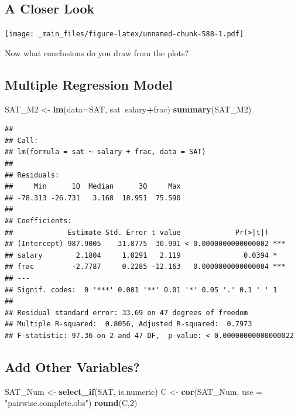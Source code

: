 \documentclass[]{book}
\newenvironment{Shaded}{\begin{snugshade}}{\end{snugshade}}
\newcommand{\KeywordTok}[1]{\textcolor[rgb]{0.13,0.29,0.53}{\textbf{#1}}}
\newcommand{\DataTypeTok}[1]{\textcolor[rgb]{0.13,0.29,0.53}{#1}}
\newcommand{\DecValTok}[1]{\textcolor[rgb]{0.00,0.00,0.81}{#1}}
\newcommand{\StringTok}[1]{\textcolor[rgb]{0.31,0.60,0.02}{#1}}
\newcommand{\OperatorTok}[1]{\textcolor[rgb]{0.81,0.36,0.00}{\textbf{#1}}}
\newcommand{\NormalTok}[1]{#1}
\begin{document}
\subsection{A Closer Look}\label{a-closer-look-1}

\texttt{[image: \_main\_files/figure-latex/unnamed-chunk-588-1.pdf]}

Now what conclusions do you draw from the plots?

\subsection{Multiple Regression
Model}\label{multiple-regression-model-2}

\begin{Shaded}
\begin{Highlighting}[]
\NormalTok{SAT_M2 <-}\StringTok{ }\KeywordTok{lm}\NormalTok{(}\DataTypeTok{data=}\NormalTok{SAT, sat}\OperatorTok{~}\NormalTok{salary}\OperatorTok{+}\NormalTok{frac)}
\KeywordTok{summary}\NormalTok{(SAT_M2)}
\end{Highlighting}
\end{Shaded}

\begin{verbatim}
## 
## Call:
## lm(formula = sat ~ salary + frac, data = SAT)
## 
## Residuals:
##     Min      1Q  Median      3Q     Max 
## -78.313 -26.731   3.168  18.951  75.590 
## 
## Coefficients:
##             Estimate Std. Error t value             Pr(>|t|)    
## (Intercept) 987.9005    31.8775  30.991 < 0.0000000000000002 ***
## salary        2.1804     1.0291   2.119               0.0394 *  
## frac         -2.7787     0.2285 -12.163   0.0000000000000004 ***
## ---
## Signif. codes:  0 '***' 0.001 '**' 0.01 '*' 0.05 '.' 0.1 ' ' 1
## 
## Residual standard error: 33.69 on 47 degrees of freedom
## Multiple R-squared:  0.8056, Adjusted R-squared:  0.7973 
## F-statistic: 97.36 on 2 and 47 DF,  p-value: < 0.00000000000000022
\end{verbatim}

\subsection{Add Other Variables?}\label{add-other-variables}

\begin{Shaded}
\begin{Highlighting}[]
\NormalTok{SAT_Num <-}\StringTok{ }\KeywordTok{select_if}\NormalTok{(SAT, is.numeric)}
\NormalTok{C <-}\StringTok{ }\KeywordTok{cor}\NormalTok{(SAT_Num, }\DataTypeTok{use =} \StringTok{"pairwise.complete.obs"}\NormalTok{)}
\KeywordTok{round}\NormalTok{(C,}\DecValTok{2}\NormalTok{)}
\end{Highlighting}
\end{Shaded}
\end{document}
